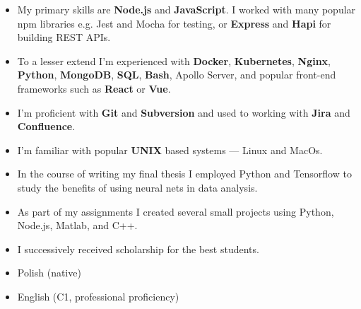 \begin{itemize}
\item My primary skills are \textbf{Node.js} and \textbf{JavaScript}. I worked with many popular npm libraries e.g. Jest and Mocha for testing, or \textbf{Express} and \textbf{Hapi} for building REST APIs.
\item To a lesser extend I’m experienced with \textbf{Docker}, \textbf{Kubernetes}, \textbf{Nginx}, \textbf{Python}, \textbf{MongoDB}, \textbf{SQL}, \textbf{Bash}, Apollo Server, and popular front-end frameworks such as \textbf{React} or \textbf{Vue}.
\item I’m proficient with \textbf{Git} and \textbf{Subversion} and used to working with \textbf{Jira} and \textbf{Confluence}.
\item I’m familiar with popular \textbf{UNIX} based systems — Linux and MacOs.
\end{itemize}

\begin{itemize}
    \item In the course of writing my final thesis I employed Python and Tensorflow to study the benefits of using neural nets in data analysis.
    \item As part of my assignments I created several small projects using Python, Node.js, Matlab, and C++.
    \item I successively received scholarship for the best students.
\end{itemize}

\begin{itemize}
    \item Polish (native)
    \item English (C1, professional proficiency)
\end{itemize}
